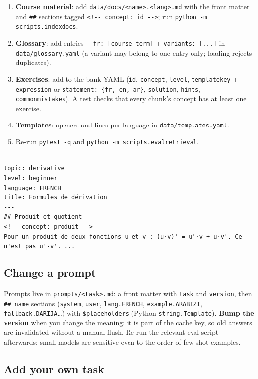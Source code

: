 \documentclass[11pt,a4paper]{article}
\renewcommand{\_}{\origus\allowbreak}
\begin{document}
\begin{enumerate}
  \item \textbf{Course material}: add \texttt{data/docs/<name>.<lang>.md} with the front matter and
  \texttt{\#\#} sections tagged \texttt{<!-{}- concept: id -{}->}; run \texttt{python -m scripts.index\_docs}.
  \item \textbf{Glossary}: add entries \texttt{- fr: [course term]} + \texttt{variants: [...]} in
  \texttt{data/glossary.yaml} (a variant may belong to one entry only; loading rejects duplicates).
  \item \textbf{Exercises}: add to the bank YAML (\texttt{id}, \texttt{concept}, \texttt{level}, \texttt{template\_key} +
  \texttt{expression} or \texttt{statement: \{fr, en, ar\}}, \texttt{solution}, \texttt{hints}, \texttt{common\_mistakes}). A test
  checks that every chunk's concept has at least one exercise.
  \item \textbf{Templates}: openers and lines per language in \texttt{data/templates.yaml}.
  \item Re-run \texttt{pytest -q} and \texttt{python -m scripts.eval\_retrieval}.
\end{enumerate}

\begin{lstlisting}[style=plain]
---
topic: derivative
level: beginner
language: FRENCH
title: Formules de dérivation
---
## Produit et quotient
<!-- concept: produit -->
Pour un produit de deux fonctions u et v : (u·v)' = u'·v + u·v'. Ce n'est pas u'·v'. ...
\end{lstlisting}

\subsection{Change a prompt}

Prompts live in \texttt{prompts/<task>.md}: a front matter with \texttt{task} and \texttt{version}, then
\texttt{\#\# name} sections (\texttt{system}, \texttt{user}, \texttt{lang.FRENCH}, \texttt{example.ARABIZI},
\texttt{fallback.DARIJA}\dots) with \texttt{\$placeholders} (Python \texttt{string.Template}). \textbf{Bump the
version} when you change the meaning: it is part of the cache key, so old answers are invalidated
without a manual flush. Re-run the relevant eval script afterwards: small models are sensitive even to
the order of few-shot examples.

\subsection{Add your own task}
\label{sec:custom-task}
\end{document}
